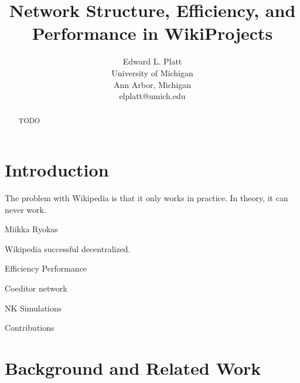 \documentclass[10pt,twocolumn]{article}
\begin{document}
\title{Network Structure, Efficiency, and Performance in WikiProjects}


\author{Edward L. Platt \\ University of Michigan \\ Ann Arbor, Michigan \\ elplatt@umich.edu}



%





\maketitle

\begin{abstract}
TODO
\end{abstract}

\section{Introduction}
\epigraph
{The problem with Wikipedia is that it only works in practice. In theory, it can never work.}
{Miikka Ryokas \cite{cohen_latest_2007} }

Wikipedia successful decentralized.

Efficiency Performance

Coeditor network

NK Simulations

Contributions

\section{Background and Related Work}
\end{document}
